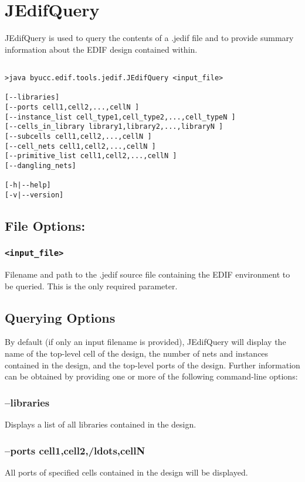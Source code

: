 \section{JEdifQuery}
JEdifQuery is used to query the contents of a .jedif file and to
provide summary information about the EDIF design contained within.
\begin{verbatim}

>java byucc.edif.tools.jedif.JEdifQuery <input_file>

[--libraries] 
[--ports cell1,cell2,...,cellN ] 
[--instance_list cell_type1,cell_type2,...,cell_typeN ]
[--cells_in_library library1,library2,...,libraryN ]
[--subcells cell1,cell2,...,cellN ] 
[--cell_nets cell1,cell2,...,cellN ]
[--primitive_list cell1,cell2,...,cellN ]
[--dangling_nets]

[-h|--help] 
[-v|--version]

\end{verbatim}

\subsection{File Options:}
\subsubsection{\texttt{<input\_file>}}
Filename and path to the .jedif source file containing the EDIF environment to be queried. This is the only required parameter.

\subsection{Querying Options}
  By default (if only an input filename is provided), JEdifQuery will
  display the name of the top-level cell of the design, the number of
  nets and instances contained in the design, and the top-level ports
  of the design. Further information can be obtained by providing one
  or more of the following command-line options:

  \subsubsection{--libraries}
     Displays a list of all libraries contained in the design.

  \subsubsection{--ports cell1,cell2,/ldots,cellN }
        All ports of specified cells contained in the design will be displayed.

